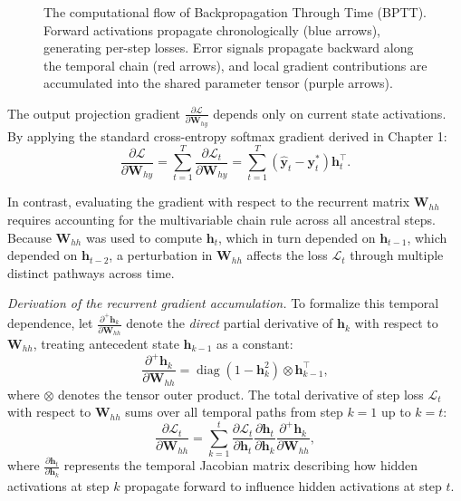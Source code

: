 \documentclass[../../../main.tex]{subfiles}
\begin{document}
\begin{figure}[htbp]
\caption{The computational flow of Backpropagation Through Time (BPTT). Forward activations propagate chronologically (blue arrows), generating per-step losses. Error signals propagate backward along the temporal chain (red arrows), and local gradient contributions are accumulated into the shared parameter tensor (purple arrows).}
\label{fig:rnn_bptt_flow}
\end{figure}

The output projection gradient $\frac{\partial \mathcal{L}}{\partial \mathbf{W}_{hy}}$ depends only on current state activations. By applying the standard cross-entropy softmax gradient derived in Chapter 1:
\begin{equation}
\frac{\partial \mathcal{L}}{\partial \mathbf{W}_{hy}} = \sum_{t=1}^T \frac{\partial \mathcal{L}_t}{\partial \mathbf{W}_{hy}} = \sum_{t=1}^T \left(\hat{\mathbf{y}}_t - \mathbf{y}_t^*\right) \mathbf{h}_t^\top.
\label{eq:bptt_why}
\end{equation}

In contrast, evaluating the gradient with respect to the recurrent matrix $\mathbf{W}_{hh}$ requires accounting for the multivariable chain rule across all ancestral steps. Because $\mathbf{W}_{hh}$ was used to compute $\mathbf{h}_t$, which in turn depended on $\mathbf{h}_{t-1}$, which depended on $\mathbf{h}_{t-2}$, a perturbation in $\mathbf{W}_{hh}$ affects the loss $\mathcal{L}_t$ through multiple distinct pathways across time.

\textit{Derivation of the recurrent gradient accumulation.} To formalize this temporal dependence, let $\frac{\partial^+ \mathbf{h}_k}{\partial \mathbf{W}_{hh}}$ denote the \textit{direct} partial derivative of $\mathbf{h}_k$ with respect to $\mathbf{W}_{hh}$, treating antecedent state $\mathbf{h}_{k-1}$ as a constant:
\begin{equation}
\frac{\partial^+ \mathbf{h}_k}{\partial \mathbf{W}_{hh}} = \operatorname{diag}\left(1 - \mathbf{h}_k^2\right) \otimes \mathbf{h}_{k-1}^\top,
\label{eq:direct_derivative_whh}
\end{equation}
where $\otimes$ denotes the tensor outer product. The total derivative of step loss $\mathcal{L}_t$ with respect to $\mathbf{W}_{hh}$ sums over all temporal paths from step $k=1$ up to $k=t$:
\begin{equation}
\frac{\partial \mathcal{L}_t}{\partial \mathbf{W}_{hh}} = \sum_{k=1}^t \frac{\partial \mathcal{L}_t}{\partial \mathbf{h}_t} \frac{\partial \mathbf{h}_t}{\partial \mathbf{h}_k} \frac{\partial^+ \mathbf{h}_k}{\partial \mathbf{W}_{hh}},
\label{eq:step_loss_whh}
\end{equation}
where $\frac{\partial \mathbf{h}_t}{\partial \mathbf{h}_k}$ represents the temporal Jacobian matrix describing how hidden activations at step $k$ propagate forward to influence hidden activations at step $t$.
\end{document}
